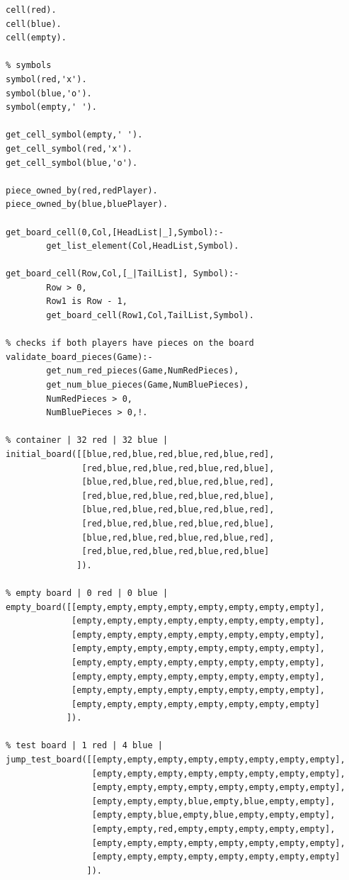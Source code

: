 \documentclass[a4paper]{article}
\begin{document}
\begin{lstlisting}[style=customprologwithlines]
% cell contents
cell(red).
cell(blue).
cell(empty).

% symbols
symbol(red,'x').
symbol(blue,'o').
symbol(empty,' ').

get_cell_symbol(empty,' ').
get_cell_symbol(red,'x').
get_cell_symbol(blue,'o').

piece_owned_by(red,redPlayer).
piece_owned_by(blue,bluePlayer).

get_board_cell(0,Col,[HeadList|_],Symbol):-
        get_list_element(Col,HeadList,Symbol).

get_board_cell(Row,Col,[_|TailList], Symbol):-
        Row > 0,
        Row1 is Row - 1,
        get_board_cell(Row1,Col,TailList,Symbol).

% checks if both players have pieces on the board
validate_board_pieces(Game):-
        get_num_red_pieces(Game,NumRedPieces),
        get_num_blue_pieces(Game,NumBluePieces),
        NumRedPieces > 0,
        NumBluePieces > 0,!.

% container | 32 red | 32 blue |
initial_board([[blue,red,blue,red,blue,red,blue,red],
               [red,blue,red,blue,red,blue,red,blue],
               [blue,red,blue,red,blue,red,blue,red],
               [red,blue,red,blue,red,blue,red,blue],
               [blue,red,blue,red,blue,red,blue,red],
               [red,blue,red,blue,red,blue,red,blue],
               [blue,red,blue,red,blue,red,blue,red],
               [red,blue,red,blue,red,blue,red,blue]
              ]).

% empty board | 0 red | 0 blue |
empty_board([[empty,empty,empty,empty,empty,empty,empty,empty],
             [empty,empty,empty,empty,empty,empty,empty,empty],
             [empty,empty,empty,empty,empty,empty,empty,empty],
             [empty,empty,empty,empty,empty,empty,empty,empty],
             [empty,empty,empty,empty,empty,empty,empty,empty],
             [empty,empty,empty,empty,empty,empty,empty,empty],
             [empty,empty,empty,empty,empty,empty,empty,empty],
             [empty,empty,empty,empty,empty,empty,empty,empty]
            ]).

% test board | 1 red | 4 blue |
jump_test_board([[empty,empty,empty,empty,empty,empty,empty,empty],
                 [empty,empty,empty,empty,empty,empty,empty,empty],
                 [empty,empty,empty,empty,empty,empty,empty,empty],
                 [empty,empty,empty,blue,empty,blue,empty,empty],
                 [empty,empty,blue,empty,blue,empty,empty,empty],
                 [empty,empty,red,empty,empty,empty,empty,empty],
                 [empty,empty,empty,empty,empty,empty,empty,empty],
                 [empty,empty,empty,empty,empty,empty,empty,empty]
                ]).


\end{lstlisting}
\end{document}
